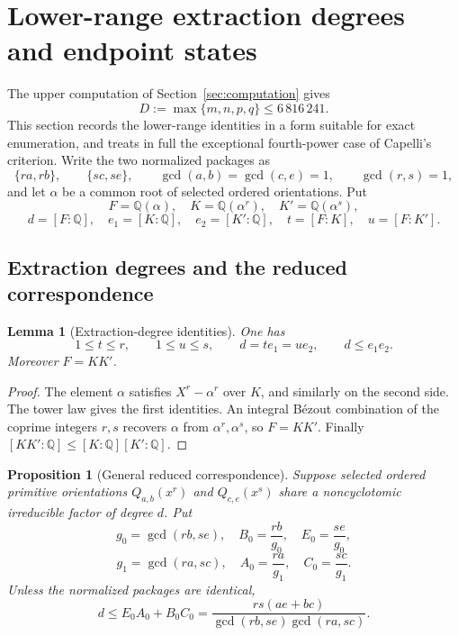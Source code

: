 \documentclass[11pt]{article}
\numberwithin{equation}{section}
\newtheorem{proposition}[theorem]{Proposition}
\newtheorem{lemma}[theorem]{Lemma}
\theoremstyle{definition}
\newcommand{\Q}{\mathbb Q}
\begin{document}
\section{Lower-range extraction degrees and endpoint states}
\label{sec:lowerstates}

The upper computation of Section~\ref{sec:computation} gives
\[
 D:=\max\{m,n,p,q\}\leq6\,816\,241.
\]
This section records the lower-range identities in a form suitable for exact
enumeration, and treats in full the exceptional fourth-power case of Capelli's
criterion.  Write the two normalized packages as
\[
 \{ra,rb\},\qquad \{sc,se\},
 \qquad \gcd(a,b)=\gcd(c,e)=1,
 \qquad \gcd(r,s)=1,
\]
and let \(\alpha\) be a common root of selected ordered orientations.  Put
\[
 F=\Q(\alpha),\quad K=\Q(\alpha^r),\quad K'=\Q(\alpha^s),
\]
\[
 d=[F:\Q],\quad e_1=[K:\Q],\quad e_2=[K':\Q],
 \quad t=[F:K],\quad u=[F:K'].
\]

\subsection{Extraction degrees and the reduced correspondence}

\begin{lemma}[Extraction-degree identities]\label{lem:extractiondegrees}
One has
\begin{equation}
 1\leq t\leq r,\qquad 1\leq u\leq s,
 \qquad d=te_1=ue_2,
 \qquad d\leq e_1e_2.
 \label{eq:19-1}
\end{equation}
Moreover \(F=KK'\).
\end{lemma}

\begin{proof}
The element \(\alpha\) satisfies \(X^r-\alpha^r\) over \(K\), and similarly
on the second side.  The tower law gives the first identities.  An integral
B\'ezout combination of the coprime integers \(r,s\) recovers \(\alpha\)
from \(\alpha^r,\alpha^s\), so \(F=KK'\).  Finally
\([KK':\Q]\leq[K:\Q][K':\Q]\).
\end{proof}

\begin{proposition}[General reduced correspondence]
\label{prop:reducedcorrespondence}
Suppose selected ordered primitive orientations \(Q_{a,b}(x^r)\) and
\(Q_{c,e}(x^s)\) share a noncyclotomic irreducible factor of degree \(d\).
Put
\[
 g_0=\gcd(rb,se),\quad B_0=\frac{rb}{g_0},\quad E_0=\frac{se}{g_0},
\]
\[
 g_1=\gcd(ra,sc),\quad A_0=\frac{ra}{g_1},\quad C_0=\frac{sc}{g_1}.
\]
Unless the normalized packages are identical,
\begin{equation}
 \boxed{d\leq E_0A_0+B_0C_0
 =\frac{rs(ae+bc)}{\gcd(rb,se)\gcd(ra,sc)}.}
 \label{eq:19-2}
\end{equation}
\end{proposition}
\end{document}
